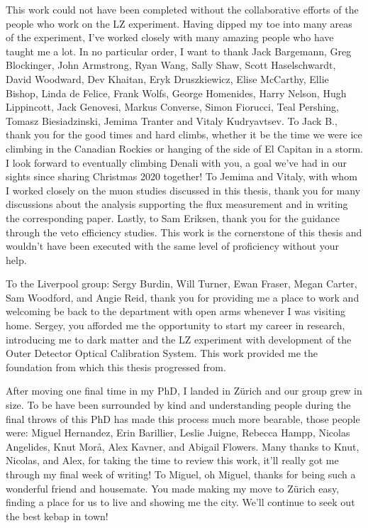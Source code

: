 \documentclass[a4paper,11pt,usegeometry]{scrreprt} %
\begin{document}
This work could not have been completed without the collaborative efforts of the people who work on the LZ experiment. Having dipped my toe into many areas of the experiment, I've worked closely with many amazing people who have taught me a lot. In no particular order, I want to thank Jack Bargemann, Greg Blockinger, John Armstrong, Ryan Wang, Sally Shaw, Scott Haselschwardt, David Woodward, Dev Khaitan, Eryk Druszkiewicz, Elise McCarthy, Ellie Bishop, Linda de Felice, Frank Wolfs, George Homenides, Harry Nelson, Hugh Lippincott, Jack Genovesi, Markus Converse, Simon Fiorucci, Teal Pershing, Tomasz Biesiadzinski, Jemima Tranter and Vitaly Kudryavtsev. To Jack B., thank you for the good times and hard climbs, whether it be the time we were ice climbing in the Canadian Rockies or hanging of the side of El Capitan in a storm. I look forward to eventually climbing Denali with you, a goal we've had in our sights since sharing Christmas 2020 together! To Jemima and Vitaly, with whom I worked closely on the muon studies discussed in this thesis, thank you for many discussions about the analysis supporting the flux measurement and in writing the corresponding paper. Lastly, to Sam Eriksen, thank you for the guidance through the veto efficiency studies. This work is the cornerstone of this thesis and wouldn't have been executed with the same level of proficiency without your help.

To the Liverpool group: Sergy Burdin, Will Turner, Ewan Fraser, Megan Carter, Sam Woodford, and Angie Reid, thank you for providing me a place to work and welcoming be back to the department with open arms whenever I was visiting home. Sergey, you afforded me the opportunity to start my career in research, introducing me to dark matter and the LZ experiment with development of the Outer Detector Optical Calibration System. This work provided me the foundation from which this thesis progressed from.

After moving one final time in my PhD, I landed in Z\"urich and our group grew in size. To be have been surrounded by kind and understanding people during the final throws of this PhD has made this process much more bearable, those people were: Miguel Hernandez, Erin Barillier, Leslie Juigne, Rebecca Hampp, Nicolas Angelides, Knut Mor\aa, Alex Kavner, and Abigail Flowers. Many thanks to Knut, Nicolas, and Alex, for taking the time to review this work, it'll really got me through my final week of writing! To Miguel, oh Miguel, thanks for being such a wonderful friend and housemate. You made making my move to Z\"urich easy, finding a place for us to live and showing me the city. We'll continue to seek out the best kebap in town!
\end{document}

